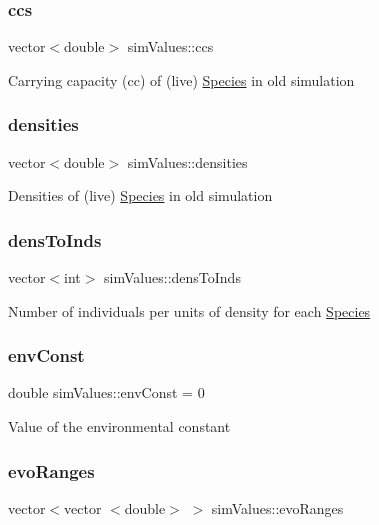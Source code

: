 \subsubsection{\texorpdfstring{ccs}{ccs}}
{\footnotesize\ttfamily vector$<$double$>$ sim\+Values\+::ccs}

Carrying capacity (cc) of (live) \hyperlink{classSpecies}{Species} in old simulation \hypertarget{structsimValues_a14ed3f6bacb44ceb58b7929e90fe0516}{}\label{structsimValues_a14ed3f6bacb44ceb58b7929e90fe0516} 
\subsubsection{\texorpdfstring{densities}{densities}}
{\footnotesize\ttfamily vector$<$double$>$ sim\+Values\+::densities}

Densities of (live) \hyperlink{classSpecies}{Species} in old simulation \hypertarget{structsimValues_a658893629c5a789c447057da417e5096}{}\label{structsimValues_a658893629c5a789c447057da417e5096} 
\subsubsection{\texorpdfstring{dens\+To\+Inds}{densToInds}}
{\footnotesize\ttfamily vector$<$int$>$ sim\+Values\+::dens\+To\+Inds}

Number of individuals per units of density for each \hyperlink{classSpecies}{Species} \hypertarget{structsimValues_a0b3bdcfb8a911b35e71ab03aad776453}{}\label{structsimValues_a0b3bdcfb8a911b35e71ab03aad776453} 
\subsubsection{\texorpdfstring{env\+Const}{envConst}}
{\footnotesize\ttfamily double sim\+Values\+::env\+Const = 0}

Value of the environmental constant \hypertarget{structsimValues_a5c4fa1fbabac24649729c3692bd2a59f}{}\label{structsimValues_a5c4fa1fbabac24649729c3692bd2a59f} 
\subsubsection{\texorpdfstring{evo\+Ranges}{evoRanges}}
{\footnotesize\ttfamily vector$<$vector $<$double$>$ $>$ sim\+Values\+::evo\+Ranges}

